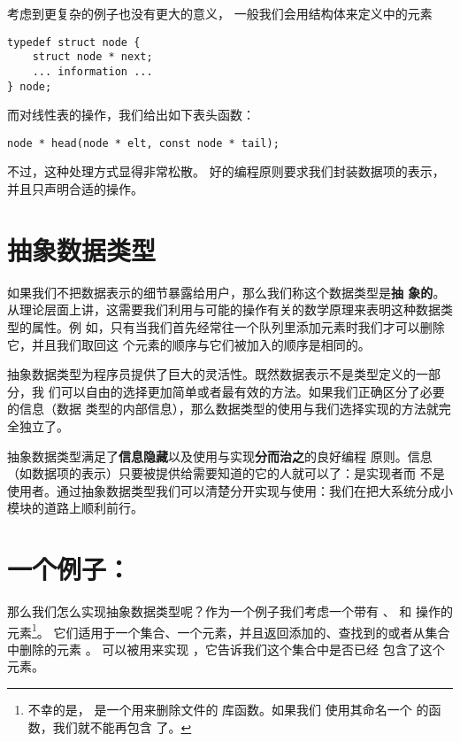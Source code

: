 考虑到更复杂的例子也没有更大的意义，
一般我们会用结构体来定义中的元素
\begin{lstlisting}
typedef struct node {
	struct node * next;
	... information ...
} node;
\end{lstlisting}
而对线性表的操作，我们给出如下表头函数：
\begin{lstlisting}
node * head(node * elt, const node * tail);
\end{lstlisting}

不过，这种处理方式显得非常松散。
好的编程原则要求我们封装数据项的表示，并且只声明合适的操作。

\section{抽象数据类型}
\label{sec:adt}

如果我们不把数据表示的细节暴露给用户，那么我们称这个数据类型是\textbf{抽
象的}。
从理论层面上讲，这需要我们利用与可能的操作有关的数学原理来表明这种数据类型的属性。例
如，只有当我们首先经常往一个队列里添加元素时我们才可以删除它，并且我们取回这
个元素的顺序与它们被加入的顺序是相同的。

抽象数据类型为程序员提供了巨大的灵活性。既然数据表示不是类型定义的一部分，我
们可以自由的选择更加简单或者最有效的方法。如果我们正确区分了必要的信息（数据
类型的内部信息），那么数据类型的使用与我们选择实现的方法就完全独立了。

抽象数据类型满足了\textbf{信息隐藏}以及使用与实现\textbf{分而治之}的良好编程
原则。信息（如数据项的表示）只要被提供给需要知道的它的人就可以了：是实现者而
不是使用者。通过抽象数据类型我们可以清楚分开实现与使用：我们在把大系统分成小
模块的道路上顺利前行。

\section{一个例子：}
\label{sec:set}
那么我们怎么实现抽象数据类型呢？作为一个例子我们考虑一个带有 、
 和  操作的元素\footnote{
不幸的是， 是一个用来删除文件的  库函数。如果我们
使用其命名一个  的函数，我们就不能再包含  了。}。
它们适用于一个集合、一个元素，并且返回添加的、查找到的或者从集合中删除的元素
。 可以被用来实现 ，它告诉我们这个集合中是否已经
包含了这个元素。

